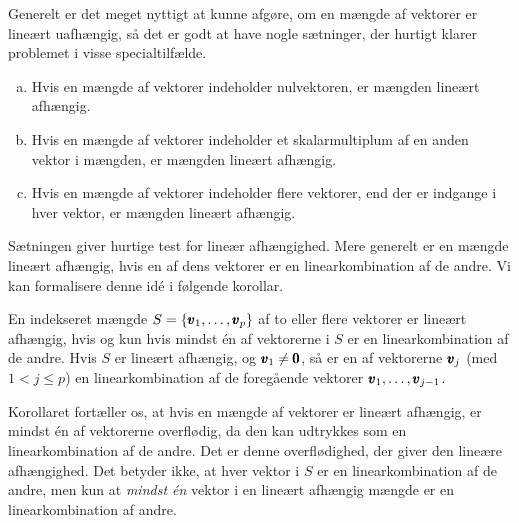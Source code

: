 Generelt er det meget nyttigt at kunne afgøre, om en mængde af vektorer er lineært uafhængig, så det er godt at have
nogle sætninger, der hurtigt klarer problemet i visse specialtilfælde.

\begin{theorem}
    \begin{enumerate}[(a)]
        \item Hvis en mængde af vektorer indeholder nulvektoren, er mængden lineært afhængig.
        \item Hvis en mængde af vektorer indeholder et skalarmultiplum af en anden vektor i mængden, er mængden lineært afhængig.
        \item Hvis en mængde af vektorer indeholder flere vektorer, end der er indgange i hver vektor, er mængden lineært afhængig.
    \end{enumerate}
\end{theorem}

Sætningen giver hurtige test for lineær afhængighed. Mere generelt er en mængde lineært afhængig, hvis en af dens vektorer er en linearkombination af de andre. Vi kan formalisere denne idé i følgende korollar.

\begin{corollary}
    En indekseret mængde $S = \left\{\pmb{v}_1, \ldots, \pmb{v}_p\right\}$ af to eller flere vektorer er lineært afhængig, hvis og kun hvis mindst én af vektorerne i $S$ er en linearkombination af de andre. Hvis $S$ er lineært afhængig, og $\pmb{v}_1 \neq \pmb{0}$, så er en af vektorerne $\pmb{v}_j$ (med $1 < j \leq p$) en linearkombination af de foregående vektorer $\pmb{v}_1, \ldots, \pmb{v}_{j-1}$.
\end{corollary}

\begin{remark}
    Korollaret fortæller os, at hvis en mængde af vektorer er lineært afhængig, er mindst én af vektorerne overflødig, da den kan udtrykkes som en linearkombination af de andre. Det er denne overflødighed, der giver den lineære afhængighed. Det betyder ikke, at hver vektor i $S$ er en linearkombination af de andre, men kun at \textit{mindst én} vektor i en lineært afhængig mængde er en linearkombination af andre.
\end{remark}

